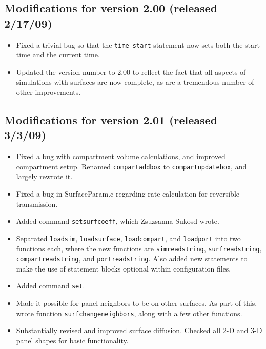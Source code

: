 \documentclass {scrbook}
\newcommand {\ttt} {\texttt}
\begin{document}
\subsection{Modifications for version 2.00 (released 2/17/09)}
\begin{itemize}
\item Fixed a trivial bug so that the \ttt{time\_start} statement now sets both the start time and the current time.
\item Updated the version number to 2.00 to reflect the fact that all aspects of simulations with surfaces are now complete, as are a tremendous number of other improvements.
\end{itemize}

\subsection{Modifications for version 2.01 (released 3/3/09)}
\begin{itemize}
\item Fixed a bug with compartment volume calculations, and improved compartment setup. Renamed \ttt{compartaddbox} to \ttt{compartupdatebox}, and largely rewrote it.
\item Fixed a bug in SurfaceParam.c regarding rate calculation for reversible transmission.
\item Added command \ttt{setsurfcoeff}, which Zsuzsanna Sukosd wrote.
\item Separated \ttt{loadsim}, \ttt{loadsurface}, \ttt{loadcompart}, and \ttt{loadport} into two functions each, where the new functions are \ttt{simreadstring}, \ttt{surfreadstring}, \ttt{compartreadstring}, and \ttt{portreadstring}. Also added new statements to make the use of statement blocks optional within configuration files.
\item Added command \ttt{set}.
\item Made it possible for panel neighbors to be on other surfaces. As part of this, wrote function \ttt{surfchangeneighbors}, along with a few other functions.
\item Substantially revised and improved surface diffusion. Checked all 2-D and 3-D panel shapes for basic functionality.
\end{itemize}
\end{document}

